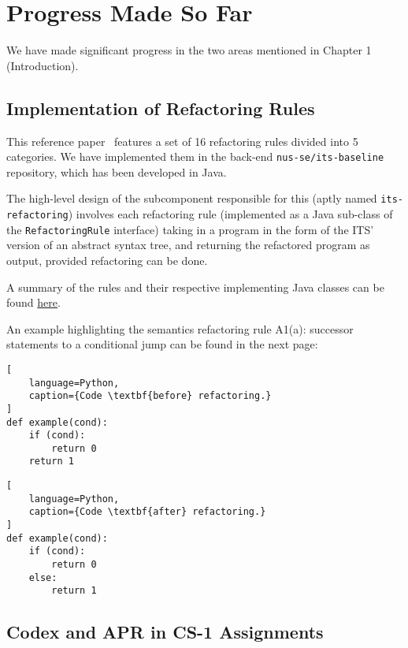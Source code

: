\chapter{Progress Made So Far}
We have made significant progress in the two areas mentioned in Chapter 1 (Introduction).

\section{Implementation of Refactoring Rules}

This reference paper~\cite{hu2019re} features a set of 16 refactoring rules divided into 5 categories.
We have implemented them in the back-end
\texttt{nus-se/its-baseline} repository,
which has been developed in Java.

The high-level design of the subcomponent responsible for this (aptly named \texttt{its-refactoring})
involves each refactoring rule (implemented as a Java sub-class of the \texttt{RefactoringRule} interface)
taking in a program in the form of the ITS' version of an abstract syntax tree, and returning the
refactored program as output, provided refactoring can be done.

A summary of the rules and their respective implementing Java classes can be found
\href{https://docs.google.com/document/d/1MnEVEUaiQ1A2MWca_qPiktKZdP6hV-1CLTXcWwK6PyE/edit}{here}.

An example highlighting the semantics refactoring rule A1(a): successor statements to a
conditional jump can be found in the next page:

\pagebreak

\begin{multicols}{2}
\begin{lstlisting}[
    language=Python,
    caption={Code \textbf{before} refactoring.}
]
def example(cond):
    if (cond):
        return 0
    return 1
\end{lstlisting}

\columnbreak

\begin{lstlisting}[
    language=Python,
    caption={Code \textbf{after} refactoring.}
]
def example(cond):
    if (cond):
        return 0
    else:
        return 1
\end{lstlisting}
\end{multicols}

\section{Codex and APR in CS-1 Assignments}

